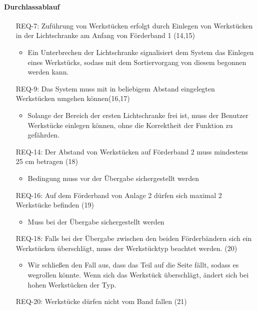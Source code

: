 \paragraph{Durchlassablauf}
\begin{itemize}
    \item[REQ-7:] Zuführung von Werkstücken erfolgt durch Einlegen von Werkstücken in der
    Lichtschranke am Anfang von Förderband 1 (14,15)
    \begin{itemize}
        \item Ein Unterbrechen der Lichtschranke signalisiert dem System das Einlegen eines Werkstücks,
        sodass mit dem Sortiervorgang von diesem begonnen werden kann.
    \end{itemize}
    \item[REQ-9:] Das System muss mit in beliebigem Abstand eingelegten Werkstücken umgehen können(16,17)
    \begin{itemize}
        \item Solange der Bereich der ersten Lichtschranke frei ist, muss der Benutzer Werkstücke
        einlegen können, ohne die Korrektheit der Funktion zu gefährden.
    \end{itemize}
    \item[REQ-14:] Der Abstand von Werkstücken auf Förderband 2 muss mindestens 25 cm betragen (18)
    \begin{itemize}
        \item Bedingung muss vor der Übergabe sichergestellt werden
    \end{itemize}
    \item[REQ-16:] Auf dem Förderband von Anlage 2 dürfen sich maximal 2 Werkstücke befinden (19)
    \begin{itemize}
        \item Muss bei der Übergabe sichergestellt werden
    \end{itemize}
    \item[REQ-18:] Falls bei der Übergabe zwischen den beiden Förderbändern sich ein Werkstücken
    überschlägt, muss der Werkstücktyp beachtet werden. (20)
    \begin{itemize}
        \item Wir schließen den Fall aus, dass das Teil auf die Seite fällt, sodass es wegrollen könnte.
        Wenn sich das Werkstück überschlägt, ändert sich bei hohen Werkstücken der Typ.
    \end{itemize}
    \item[REQ-20:] Werkstücke dürfen nicht vom Band fallen (21)

\end{itemize}
